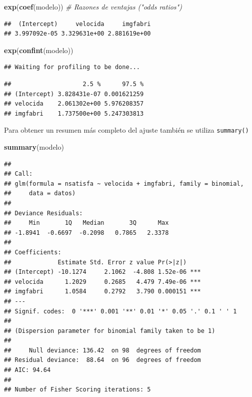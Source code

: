 \documentclass[]{book}
\newenvironment{Shaded}{\begin{snugshade}}{\end{snugshade}}
\newcommand{\KeywordTok}[1]{\textcolor[rgb]{0.13,0.29,0.53}{\textbf{#1}}}
\newcommand{\CommentTok}[1]{\textcolor[rgb]{0.56,0.35,0.01}{\textit{#1}}}
\newcommand{\NormalTok}[1]{#1}
\begin{document}
\begin{Shaded}
\begin{Highlighting}[]
\KeywordTok{exp}\NormalTok{(}\KeywordTok{coef}\NormalTok{(modelo))  }\CommentTok{# Razones de ventajas ("odds ratios")}
\end{Highlighting}
\end{Shaded}

\begin{verbatim}
##  (Intercept)     velocida     imgfabri 
## 3.997092e-05 3.329631e+00 2.881619e+00
\end{verbatim}

\begin{Shaded}
\begin{Highlighting}[]
\KeywordTok{exp}\NormalTok{(}\KeywordTok{confint}\NormalTok{(modelo))}
\end{Highlighting}
\end{Shaded}

\begin{verbatim}
## Waiting for profiling to be done...
\end{verbatim}

\begin{verbatim}
##                    2.5 %      97.5 %
## (Intercept) 3.828431e-07 0.001621259
## velocida    2.061302e+00 5.976208357
## imgfabri    1.737500e+00 5.247303813
\end{verbatim}

Para obtener un resumen más completo del ajuste también se utiliza
\texttt{summary()}

\begin{Shaded}
\begin{Highlighting}[]
\KeywordTok{summary}\NormalTok{(modelo)}
\end{Highlighting}
\end{Shaded}

\begin{verbatim}
## 
## Call:
## glm(formula = nsatisfa ~ velocida + imgfabri, family = binomial, 
##     data = datos)
## 
## Deviance Residuals: 
##     Min       1Q   Median       3Q      Max  
## -1.8941  -0.6697  -0.2098   0.7865   2.3378  
## 
## Coefficients:
##             Estimate Std. Error z value Pr(>|z|)    
## (Intercept) -10.1274     2.1062  -4.808 1.52e-06 ***
## velocida      1.2029     0.2685   4.479 7.49e-06 ***
## imgfabri      1.0584     0.2792   3.790 0.000151 ***
## ---
## Signif. codes:  0 '***' 0.001 '**' 0.01 '*' 0.05 '.' 0.1 ' ' 1
## 
## (Dispersion parameter for binomial family taken to be 1)
## 
##     Null deviance: 136.42  on 98  degrees of freedom
## Residual deviance:  88.64  on 96  degrees of freedom
## AIC: 94.64
## 
## Number of Fisher Scoring iterations: 5
\end{verbatim}
\end{document}
